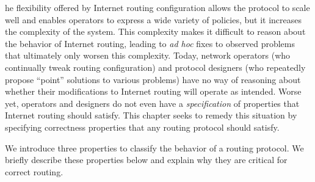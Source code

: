 
he flexibility offered by Internet routing configuration
allows the protocol to scale well and enables operators to express a wide
variety of policies, but it increases the complexity of the system.  This
complexity makes it difficult to reason about the behavior of Internet
routing, leading to {\em ad hoc} fixes to observed problems that
ultimately only worsen this complexity.  Today, network operators (who
continually tweak routing configuration) and protocol designers
(who repeatedly propose ``point'' solutions to various problems) have
no way of reasoning about whether their modifications to Internet
routing will
operate as intended.  Worse yet, operators and designers do not even
have a {\em specification} of properties that Internet routing should
satisfy.  This chapter seeks to remedy this situation by specifying
correctness properties
that any routing protocol should satisfy.

We introduce three properties to
classify the behavior of a routing protocol.  We briefly describe
these properties below and explain why they are critical for
correct routing.

